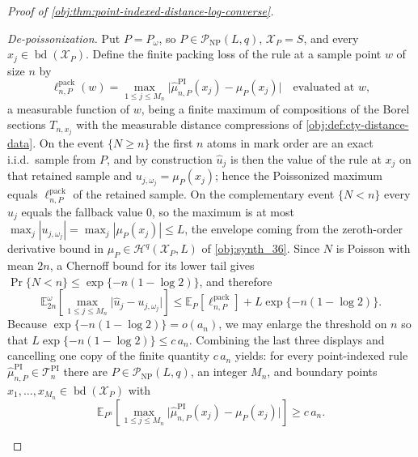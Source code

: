\documentclass[11pt]{article}
\begin{document}
\begin{proof}[Proof of \cref{obj:thm:point-indexed-distance-log-converse}]
\begin{enumerate}
\emph{De-poissonization.}  Put \(P=P_\omega\), so \(P\in\mathcal P_{\mathrm{NP}}(L,q)\), \(\mathcal X_P=S\), and every \(x_j\in\operatorname{bd}(\mathcal X_P)\).  Define the finite packing loss of the rule at a sample point \(w\) of size \(n\) by
\[
\ell^{\mathrm{pack}}_{n,P}(w)
=
\max_{1\le j\le M_n}\bigl|\widehat\mu^{\mathrm{PI}}_{n,P}(x_j)-\mu_P(x_j)\bigr|
\quad\text{evaluated at }w ,
\]
a measurable function of \(w\), being a finite maximum of compositions of the Borel sections \(T_{n,x_j}\) with the measurable distance compressions of \cref{obj:def:cty-distance-data}.
On the event \(\{N\ge n\}\) the first \(n\) atoms in mark order are an exact i.i.d.\ sample from \(P\), and by construction \(\widehat u_j\) is then the value of the rule at \(x_j\) on that retained sample and \(u_{j,\omega_j}=\mu_P(x_j)\); hence the Poissonized maximum equals \(\ell^{\mathrm{pack}}_{n,P}\) of the retained sample.
On the complementary event \(\{N<n\}\) every \(\widehat u_j\) equals the fallback value \(0\), so the maximum is at most \(\max_j|u_{j,\omega_j}|=\max_j|\mu_P(x_j)|\le L\), the envelope coming from the zeroth-order derivative bound in \(\mu_P\in\mathcal H^q(\mathcal X_P,L)\) of \cref{obj:synth_36}.
Since \(N\) is Poisson with mean \(2n\), a Chernoff bound for its lower tail gives \(\Pr\{N<n\}\le\exp\{-n(1-\log2)\}\), and therefore
\[
\mathbb E^{\omega}_{2n}\!\left[\max_{1\le j\le M_n}\bigl|\widehat u_j-u_{j,\omega_j}\bigr|\right]
\le
\mathbb E_{P}\!\left[\ell^{\mathrm{pack}}_{n,P}\right]
+
L\exp\{-n(1-\log 2)\} .
\]
Because \(\exp\{-n(1-\log2)\}=o(a_n)\), we may enlarge the threshold on \(n\) so that \(L\exp\{-n(1-\log2)\}\le c\,a_n\).
Combining the last three displays and cancelling one copy of the finite quantity \(c\,a_n\) yields: for every point-indexed rule \(\widehat\mu^{\mathrm{PI}}_{n,P}\in\mathcal T_n^{\mathrm{PI}}\) there are \(P\in\mathcal P_{\mathrm{NP}}(L,q)\), an integer \(M_n\), and boundary points \(x_1,\ldots,x_{M_n}\in\operatorname{bd}(\mathcal X_P)\) with
\[
\mathbb E_{P^n}\!\left[
\max_{1\leq j\leq M_n}
\bigl|\widehat\mu_{n,P}^{\mathrm{PI}}(x_j)-\mu_P(x_j)\bigr|
\right]
\geq c\,a_n .
\]


\end{enumerate}
\end{proof}
\end{document}
